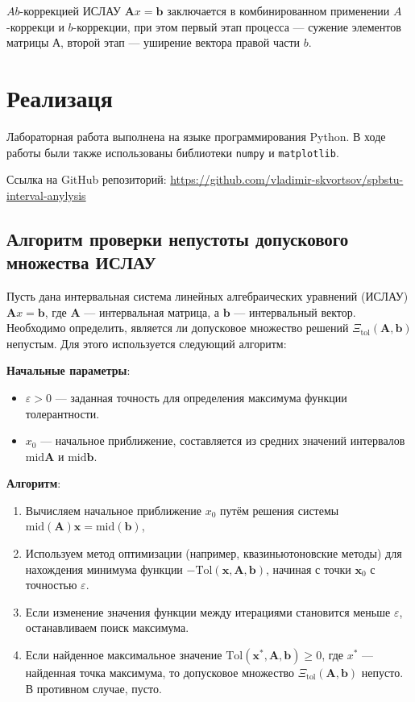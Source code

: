 \documentclass{article}
\begin{document}
  \( Ab \)-коррекцией ИСЛАУ \( \mathbf{A}x = \mathbf{b} \) заключается
  в комбинированном применении \( A \)-коррекци и \( b \)-коррекции,
  при этом первый этап процесса --- сужение элементов матрицы А,
  второй этап --- уширение вектора правой части \( b \).

  \section{Реализаця}

  Лабораторная работа выполнена на языке программирования Python. В ходе
  работы были также использованы библиотеки \verb!numpy! и
  \verb!matplotlib!.

  Ссылка на GitHub репозиторий:
  \href{https://github.com/vladimir-skvortsov/spbstu-interval-anylysis}{https://github.com/vladimir-skvortsov/spbstu-interval-anylysis}

  \subsection{Алгоритм проверки непустоты допускового множества ИСЛАУ}

  Пусть дана интервальная система линейных алгебраических уравнений
  (ИСЛАУ) \( \mathbf{A}x = \mathbf{b} \), где \( \mathbf{A} \) ---
  интервальная матрица, а \( \mathbf{b} \) — интервальный вектор.
  Необходимо определить, является ли допусковое множество решений
  \( \Xi_{\text{tol}}(\mathbf{A}, \mathbf{b}) \) непустым. Для этого
  используется следующий алгоритм:

  \textbf{Начальные параметры}:
  \begin{itemize}
    \item \( \varepsilon > 0 \) --- заданная точность для определения
      максимума функции толерантности.
    \item \( x_0 \) --- начальное приближение, составляется из средних
      значений интервалов \( \text{mid} \mathbf{A} \) и
      \( \text{mid} \mathbf{b} \).
  \end{itemize}

  \textbf{Алгоритм}:
  \begin{enumerate}
    \item Вычисляем начальное приближение \( x_0 \) путём решения системы
      \( \text{mid}(\mathbf{A}) \mathbf{x} = \text{mid}(\mathbf{b}) \),
    \item Используем метод оптимизации (например, квазиньютоновские
      методы) для нахождения минимума функции
      \( -\text{Tol}(\mathbf{x}, \mathbf{A}, \mathbf{b}) \), начиная с точки
      \( \mathbf{x}_0 \) с точностью \( \varepsilon \).
    \item Если изменение значения функции между итерациями становится
      меньше \( \varepsilon \), останавливаем поиск максимума.
    \item Если найденное максимальное значение
      \( \text{Tol}(\mathbf{x}^*, \mathbf{A}, \mathbf{b}) \geqslant 0 \), где
      \( x^* \) --- найденная точка максимума, то допусковое множество
      \( \Xi_{\text{tol}}(\mathbf{A}, \mathbf{b}) \) непусто. В противном
      случае, пусто.
  \end{enumerate}
\end{document}
